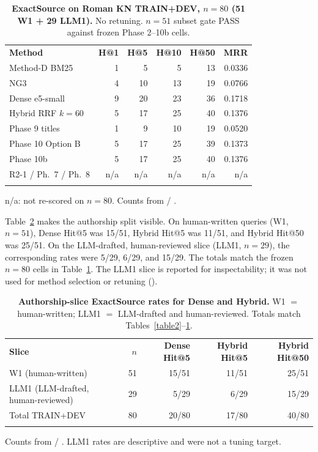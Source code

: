 \documentclass[10pt,letterpaper]{article}
\newlength\savedwidth
\newcommand\thickhline{\noalign{\global\savedwidth\arrayrulewidth\global\arrayrulewidth 2pt}%
\hline
\noalign{\global\arrayrulewidth\savedwidth}}
\begin{document}
\begin{table}[!ht]
\centering
\caption{\textbf{ExactSource on Roman KN TRAIN+DEV, $n = 80$ (51 W1 + 29 LLM1).} No retuning. $n = 51$ subset gate PASS against frozen Phase 2--10b cells.}
\label{table3}
\begin{tabular}{lrrrrr}
\thickhline
\textbf{Method} & \textbf{H@1} & \textbf{H@5} & \textbf{H@10} & \textbf{H@50} & \textbf{MRR} \\
\thickhline
Method-D BM25 & 1 & 5 & 5 & 13 & 0.0336 \\
NG3 & 4 & 10 & 13 & 19 & 0.0766 \\
Dense e5-small & 9 & 20 & 23 & 36 & 0.1718 \\
Hybrid RRF $k{=}60$ & 5 & 17 & 25 & 40 & 0.1376 \\
Phase 9 titles & 1 & 9 & 10 & 19 & 0.0520 \\
Phase 10 Option B & 5 & 17 & 25 & 39 & 0.1373 \\
Phase 10b & 5 & 17 & 25 & 40 & 0.1376 \\
R2-1 / Ph.~7 / Ph.~8 & n/a & n/a & n/a & n/a & n/a \\
\thickhline
\end{tabular}
\begin{flushleft} n/a: not re-scored on $n = 80$. Counts from  / .
\end{flushleft}
\end{table}

Table~\ref{table4} makes the authorship split visible. On human-written queries (W1, $n = 51$), Dense Hit@5 was 15/51, Hybrid Hit@5 was 11/51, and Hybrid Hit@50 was 25/51. On the LLM-drafted, human-reviewed slice (LLM1, $n = 29$), the corresponding rates were 5/29, 6/29, and 15/29. The totals match the frozen $n = 80$ cells in Table~\ref{table3}. The LLM1 slice is reported for inspectability; it was not used for method selection or retuning ().

\begin{table}[!ht]
\centering
\caption{\textbf{Authorship-slice ExactSource rates for Dense and Hybrid.} W1 $=$ human-written; LLM1 $=$ LLM-drafted and human-reviewed. Totals match Tables~\ref{table2}--\ref{table3}.}
\label{table4}
\begin{tabular}{lrrrr}
\thickhline
\textbf{Slice} & \textbf{$n$} & \textbf{Dense Hit@5} & \textbf{Hybrid Hit@5} & \textbf{Hybrid Hit@50} \\
\thickhline
W1 (human-written) & 51 & 15/51 & 11/51 & 25/51 \\
LLM1 (LLM-drafted, human-reviewed) & 29 & 5/29 & 6/29 & 15/29 \\
Total TRAIN+DEV & 80 & 20/80 & 17/80 & 40/80 \\
\thickhline
\end{tabular}
\begin{flushleft} Counts from  / . LLM1 rates are descriptive and were not a tuning target.
\end{flushleft}
\end{table}
\end{document}

